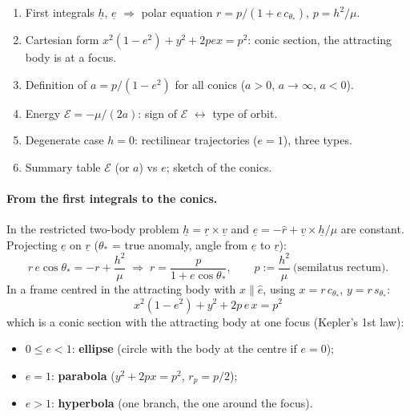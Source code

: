 \begin{outline}
\begin{enumerate}
\item First integrals $\underline h$, $\underline e$ $\Rightarrow$ polar equation $r=p/(1+e\,c_{\theta_*})$, $p=h^2/\mu$.
\item Cartesian form $x^2(1-e^2)+y^2+2pex=p^2$: conic section, the attracting body is at a focus.
\item Definition of $a=p/(1-e^2)$ for all conics ($a>0$, $a\to\infty$, $a<0$).
\item Energy $\mathcal E=-\mu/(2a)$: sign of $\mathcal E$ $\leftrightarrow$ type of orbit.
\item Degenerate case $h=0$: rectilinear trajectories ($e=1$), three types.
\item Summary table $\mathcal E$ (or $a$) vs $e$; sketch of the conics.
\end{enumerate}
\end{outline}

\answer
\paragraph{From the first integrals to the conics.} In the restricted two-body problem $\underline h=\underline r\times\underline v$
and $\underline e=-\hat r+\underline v\times\underline h/\mu$ are constant. Projecting $\underline e$ on $\underline r$
($\theta_*$ = true anomaly, angle from $\underline e$ to $\underline r$):
\begin{equation}
r\,e\cos\theta_*=-r+\frac{h^2}{\mu}\;\Longrightarrow\; r=\frac{p}{1+e\cos\theta_*},\qquad p:=\frac{h^2}{\mu}\ \text{(semilatus rectum)}.
\end{equation}
In a frame centred in the attracting body with $x\parallel\hat e$, using $x=r\,c_{\theta_*}$, $y=r\,s_{\theta_*}$:
\begin{equation}
x^{2}\left(1-e^{2}\right)+y^{2}+2p\,e\,x=p^{2}
\end{equation}
which is a conic section with the attracting body at one focus (Kepler's 1st law):
\begin{itemize}
\item $0\le e<1$: \textbf{ellipse} (circle with the body at the centre if $e=0$);
\item $e=1$: \textbf{parabola} ($y^2+2px=p^2$, $r_p=p/2$);
\item $e>1$: \textbf{hyperbola} (one branch, the one around the focus).
\end{itemize}

